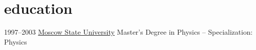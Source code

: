 \section{education}

\begin{entrylist}
\entry
{1997--2003}
{\href{https://msu.ru/en/}{Moscow State University}}
{Master’s Degree in Physics -- Specialization: Physics}
{}
\end{entrylist}
